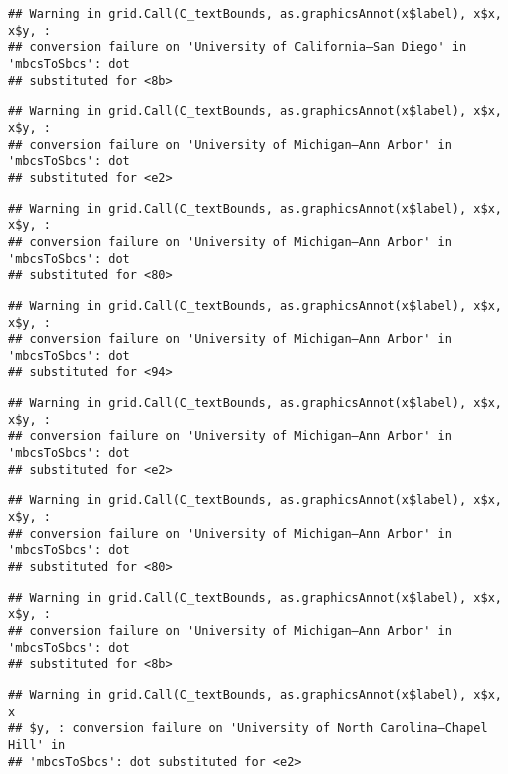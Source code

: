 \documentclass[]{article}
\begin{document}
\begin{verbatim}
## Warning in grid.Call(C_textBounds, as.graphicsAnnot(x$label), x$x, x$y, :
## conversion failure on 'University of California—​San Diego' in 'mbcsToSbcs': dot
## substituted for <8b>
\end{verbatim}

\begin{verbatim}
## Warning in grid.Call(C_textBounds, as.graphicsAnnot(x$label), x$x, x$y, :
## conversion failure on 'University of Michigan—​Ann Arbor' in 'mbcsToSbcs': dot
## substituted for <e2>
\end{verbatim}

\begin{verbatim}
## Warning in grid.Call(C_textBounds, as.graphicsAnnot(x$label), x$x, x$y, :
## conversion failure on 'University of Michigan—​Ann Arbor' in 'mbcsToSbcs': dot
## substituted for <80>
\end{verbatim}

\begin{verbatim}
## Warning in grid.Call(C_textBounds, as.graphicsAnnot(x$label), x$x, x$y, :
## conversion failure on 'University of Michigan—​Ann Arbor' in 'mbcsToSbcs': dot
## substituted for <94>
\end{verbatim}

\begin{verbatim}
## Warning in grid.Call(C_textBounds, as.graphicsAnnot(x$label), x$x, x$y, :
## conversion failure on 'University of Michigan—​Ann Arbor' in 'mbcsToSbcs': dot
## substituted for <e2>
\end{verbatim}

\begin{verbatim}
## Warning in grid.Call(C_textBounds, as.graphicsAnnot(x$label), x$x, x$y, :
## conversion failure on 'University of Michigan—​Ann Arbor' in 'mbcsToSbcs': dot
## substituted for <80>
\end{verbatim}

\begin{verbatim}
## Warning in grid.Call(C_textBounds, as.graphicsAnnot(x$label), x$x, x$y, :
## conversion failure on 'University of Michigan—​Ann Arbor' in 'mbcsToSbcs': dot
## substituted for <8b>
\end{verbatim}

\begin{verbatim}
## Warning in grid.Call(C_textBounds, as.graphicsAnnot(x$label), x$x, x
## $y, : conversion failure on 'University of North Carolina—​Chapel Hill' in
## 'mbcsToSbcs': dot substituted for <e2>
\end{verbatim}
\end{document}
